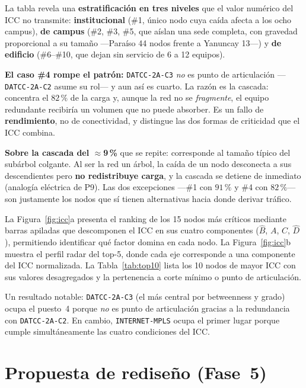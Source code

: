 \documentclass[11pt, a4paper]{article}
\begin{document}
La tabla revela una \textbf{estratificación en tres niveles} que el valor
numérico del ICC no transmite: \textbf{institucional} (\#1, único nodo cuya
caída afecta a los ocho campus), \textbf{de campus} (\#2, \#3, \#5, que
aíslan una sede completa, con gravedad proporcional a su tamaño —Paraíso 44
nodos frente a Yanuncay 13—) y \textbf{de edificio} (\#6--\#10, que dejan
sin servicio de 6 a 12 equipos).

\textbf{El caso \#4 rompe el patrón:} \texttt{DATCC-2A-C3} \textit{no} es
punto de articulación —\texttt{DATCC-2A-C2} asume su rol— y aun así es
cuarto. La razón es la cascada: concentra el $82\,\%$ de la carga y, aunque
la red no se \textit{fragmente}, el equipo redundante recibiría un volumen
que no puede absorber. Es un fallo de \textbf{rendimiento}, no de
conectividad, y distingue las dos formas de criticidad que el ICC combina.

\textbf{Sobre la cascada del $\approx$9\,\%} que se repite: corresponde al
tamaño típico del subárbol colgante. Al ser la red un árbol, la caída de un
nodo desconecta a sus descendientes pero \textbf{no redistribuye carga}, y
la cascada se detiene de inmediato (analogía eléctrica de P9). Las dos
excepciones —\#1 con $91\,\%$ y \#4 con $82\,\%$— son justamente los nodos
que sí tienen alternativas hacia donde derivar tráfico.

La Figura~\ref{fig:icc}a presenta el ranking de los 15 nodos más críticos
mediante barras apiladas que descomponen el ICC en sus cuatro componentes
($\hat{B}$, $A$, $C$, $\hat{D}$), permitiendo identificar qué factor
domina en cada nodo. La Figura~\ref{fig:icc}b muestra el perfil radar del
top-5, donde cada eje corresponde a una componente del ICC normalizada.
La Tabla~\ref{tab:top10} lista los 10 nodos de mayor ICC con sus valores
desagregados y la pertenencia a corte mínimo o punto de articulación.

Un resultado notable: \texttt{DATCC-2A-C3} (el más central por betweenness
y grado) ocupa el puesto~4 porque \textit{no} es punto de articulación
gracias a la redundancia con \texttt{DATCC-2A-C2}. En cambio,
\texttt{INTERNET-MPLS} ocupa el primer lugar porque cumple simultáneamente
las cuatro condiciones del ICC.

\section{Propuesta de rediseño (Fase~5)}
\end{document}
